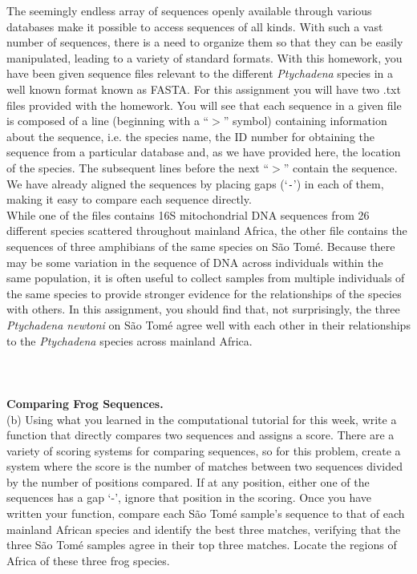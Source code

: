 \documentclass[12pt]{article}    %
\begin{document}
The seemingly endless array of sequences openly available through various
databases make it possible to access sequences of all kinds. With such a vast
number of sequences, there is a need to organize them so that they can be easily
manipulated,  leading to a variety of standard formats. With this homework, you
have been given sequence files relevant to the different \emph{Ptychadena}
species in a well known format known as FASTA.  For this assignment you will
have  two .txt files provided with the homework.  You will see that each
sequence in a given  file is composed of a line (beginning with a ``$>$''
symbol) containing information about the sequence, i.e. the species name, the ID
number for obtaining the sequence from a particular database  and, as we have
provided here, the location of the species.  The subsequent lines before the
next ``$>$'' contain the sequence. We have already  aligned the sequences by
placing gaps (`\texttt{-}')  in each of them, making it easy to compare each
sequence directly. \\

While one of the files contains 16S mitochondrial DNA sequences from 26
different species scattered throughout mainland Africa, the other file contains
the sequences of three amphibians of the same species on S\~ao Tom\'e. Because
there may be some variation in the sequence of DNA across individuals within the
same population,  it is often useful to collect samples from multiple
individuals of the same species  to provide stronger evidence for the
relationships of the species with others. In this assignment, you should find
that, not surprisingly, the three \emph{Ptychadena newtoni} on S\~ao Tom\'e
agree well with each other in their relationships to the \emph{Ptychadena}
species across mainland Africa.\\
\\
\\
\\
{\bf{Comparing Frog Sequences.}}\\

(b)  Using what you learned in the computational tutorial for
this week, write a function that directly compares two sequences and assigns a
score. There are a variety of scoring systems for comparing sequences, so for
this problem, create a system where the score  is the number of matches between
two sequences divided by the number of positions compared. If at any position,
either one of  the sequences has a gap `-', ignore that position in the
scoring.   Once you have written your function, compare each S\~{a}o Tom\'{e}
sample's sequence 	to that of each mainland African species and identify the
best three matches, verifying that the three S\~{a}o Tom\'{e} samples agree in
their top three matches. Locate the regions of Africa of these three frog
species.\\
\end{document}
